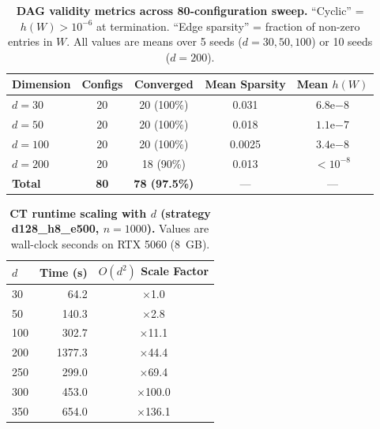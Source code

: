 \documentclass[12pt,a4paper]{article}
\begin{document}
\newpage
\begin{table}[H]
\centering
\caption{\textbf{DAG validity metrics across 80-configuration sweep.} ``Cyclic'' = $h(W) > 10^{-6}$ at termination. ``Edge sparsity'' = fraction of non-zero entries in $W$. All values are means over 5 seeds ($d=30,50,100$) or 10 seeds ($d=200$).}
\label{tab:s_ct_dag}
\small
\begin{tabular}{lcccc}
\toprule
Dimension & Configs & Converged & Mean Sparsity & Mean $h(W)$ \\
\midrule
$d=30$ & 20 & 20 (100\%) & 0.031 & $6.8$e$-8$ \\
$d=50$ & 20 & 20 (100\%) & 0.018 & $1.1$e$-7$ \\
$d=100$ & 20 & 20 (100\%) & 0.0025 & $3.4$e$-8$ \\
$d=200$ & 20 & 18 (90\%) & 0.013 & $< 10^{-8}$ \\
\midrule
\textbf{Total} & \textbf{80} & \textbf{78 (97.5\%)} & --- & --- \\
\bottomrule
\end{tabular}
\end{table}
\newpage
\begin{table}[H]
\centering
\caption{\textbf{CT runtime scaling with $d$ (strategy d128\_h8\_e500, $n=1000$).} Values are wall-clock seconds on RTX 5060 (8~GB).}
\label{tab:s_ct_runtime}
\small
\begin{tabular}{lrc}
\toprule
$d$ & Time (s) & $O(d^2)$ Scale Factor \\
\midrule
30 & 64.2 & $\times$1.0 \\
50 & 140.3 & $\times$2.8 \\
100 & 302.7 & $\times$11.1 \\
200 & 1377.3 & $\times$44.4 \\
250 & 299.0 & $\times$69.4 \\
300 & 453.0 & $\times$100.0 \\
350 & 654.0 & $\times$136.1 \\
\bottomrule
\end{tabular}
\end{table}
\newpage
\end{document}
